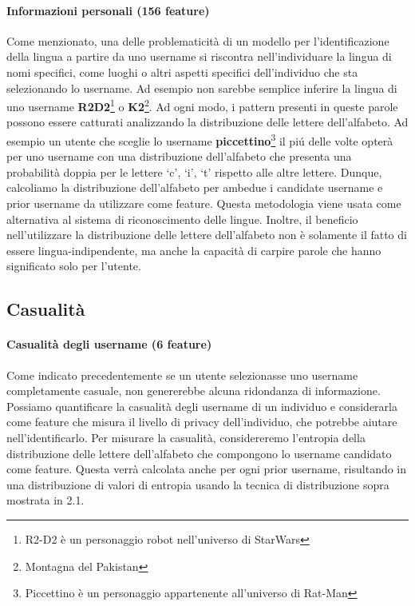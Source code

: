 \paragraph{Informazioni personali (156 feature)}
Come menzionato, una delle problematicità di un modello per l'identificazione della lingua a partire da uno username si riscontra nell'individuare la lingua di nomi specifici, come luoghi o altri aspetti specifici dell'individuo che sta selezionando lo username. Ad esempio non sarebbe semplice inferire la lingua di uno username \textbf{R2D2}\footnote{R2-D2 è un personaggio robot nell'universo di StarWars} o \textbf{K2}\footnote{Montagna del Pakistan}. Ad ogni modo, i pattern presenti in queste parole possono essere catturati analizzando la distribuzione delle lettere dell'alfabeto. Ad esempio un utente che sceglie lo username \textbf{piccettino}\footnote{Piccettino è un personaggio appartenente all'universo di Rat-Man} il piú delle volte opterà per uno username con una distribuzione dell'alfabeto che presenta una probabilità doppia per le lettere ‘c’, ‘i’, ‘t’  rispetto alle altre lettere. Dunque, calcoliamo la distribuzione dell'alfabeto per ambedue i candidate username e prior username da utilizzare come feature. Questa metodologia viene usata come alternativa al sistema di riconoscimento delle lingue. Inoltre, il beneficio nell'utilizzare la distribuzione delle lettere dell'alfabeto non è solamente il fatto di essere lingua-indipendente, ma anche la capacità di carpire parole che hanno significato solo per l'utente.\newline
\subsection{Casualità}
\paragraph{Casualità degli username (6 feature)}
Come indicato precedentemente se un utente selezionasse uno username completamente casuale, non genererebbe alcuna ridondanza di informazione. Possiamo quantificare la casualità degli username di un individuo e considerarla come feature che misura il livello di privacy dell'individuo, che potrebbe aiutare nell'identificarlo. Per misurare la casualità, considereremo l'entropia\cite{thomcov} della distribuzione delle lettere dell'alfabeto che compongono lo username candidato come feature. Questa verrà calcolata anche per ogni prior username, risultando in una distribuzione di valori di entropia usando la tecnica di distribuzione sopra mostrata in 2.1.
